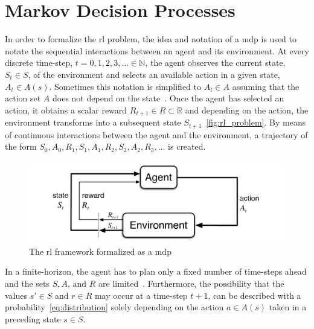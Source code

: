 \documentclass[draft,final]{vutinfth} %
\newcommand{\p}[1]{see p. #1}
\begin{document}
    \section{Markov Decision Processes}
    In order to formalize the \gls{rl} problem, the idea and notation of a \gls{mdp} is used to notate the sequential interactions between an agent and its environment.
    At every discrete time-step, $t = 0,1,2,3, \ldots \in \mathbb{N}$, the agent observes the current state, $S_t \in \mathit{S}$, of the environment and selects an available action in a given state, $A_t \in \mathit{A}(s)$.
    Sometimes this notation is simplified to $A_t \in \mathit{A}$ assuming that the action set $\mathit{A}$ does not depend on the state~\citep[\p{48}]{sutton_reinforcement_2018}.
    Once the agent has selected an action, it obtains a scalar reward $R_{t+1} \in \mathit{R} \subset \mathbb{R}$ and depending on the action, the environment transforms into a subsequent state $S_{t+1}$~\eqref{fig:rl_problem}.
    By means of continuous interactions between the agent and the environment, a trajectory of the form $S_0,A_0,R_1,S_1,A_1,R_2,S_2,A_2,R_3,\ldots$ is created.

    \begin{figure}[h]
        \centering
        \includegraphics[width=\textwidth]{figures/rl_problem.png}
        \caption[The \gls{rl} framework formalized as a \gls{mdp}]{The \gls{rl} framework formalized as a \gls{mdp}\protect\footnotemark}
        \label{fig:rl_problem}
    \end{figure}

    \footnotetext{\cite[\p{48}]{sutton_reinforcement_2018}}

    In a finite-horizon, the agent has to plan only a fixed number of time-steps ahead and the sets $\mathit{S},\mathit{A}\text{, and }\mathit{R}$ are limited~\citep{kaelbling_reinforcement_1996,sutton_reinforcement_2018}.
    Furthermore, the possibility that the values $s'\in \mathit{S}$ and $r \in \mathit{R}$ may occur at a time-step $t+1$, can be described with a probability~\eqref{eq:distribution} solely depending on the action $a \in \mathit{A}(s)$ taken in a preceding state $s \in \mathit{S}$.
\end{document}
